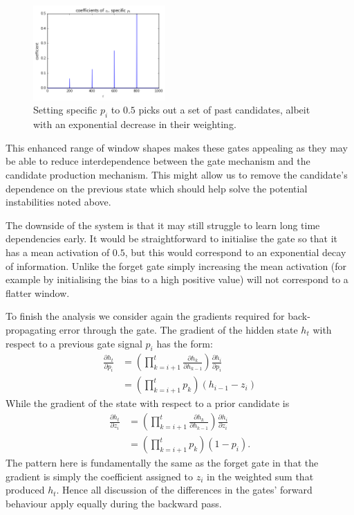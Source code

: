 \begin{figure}[tbp]
\centering
\includegraphics[width=0.45\textwidth]{newarchs/cvextrain}
\caption[Convex gate choosing several past candidates]
{Setting specific \(p_i\) to \(0.5\) picks out a set of past candidates, albeit with
an exponential decrease in their weighting.}
\label{fig:cvextrain}
\end{figure}

This enhanced range of window shapes makes these gates appealing as they may be able to reduce
interdependence between the gate mechanism and the candidate production mechanism. This might
allow us to remove the candidate's dependence on the previous state which should help solve the
potential instabilities noted above.

The downside of the system is that it may still struggle to learn long time dependencies early.
It would be straightforward to initialise the gate so that it has a mean activation of \(0.5\),
but this would correspond to an exponential decay of information. Unlike the forget gate simply
increasing the mean activation (for example by initialising the bias to a high positive value)
will not correspond to a flatter window.

To finish the analysis we consider again the gradients required for back-propagating error through
the gate. The gradient of the hidden state \(h_t\) with respect to a previous gate signal
\(p_i\) has the form:
\begin{align}
	\frac{\partial h_t}{\partial p_i} &= 
		\left(\prod_{k=i+1}^t \frac{\partial h_k}{\partial h_{k-1}}\right) 
			\frac{\partial h_i}{\partial p_i} \\
	&= \left( \prod_{k=i+1}^t p_k \right) (h_{i-1} - z_i) \label{eq:cvexgrad}
\end{align}
While the gradient of the state with respect to a prior candidate is
\begin{align}
	\frac{\partial h_t}{\partial z_i} &=
		\left(\prod_{k=i+1}^t \frac{\partial h_k}{\partial h_{k-1}}\right) 
			\frac{\partial h_i}{\partial z_i} \\
	&= \left( \prod_{k=i+1}^t p_k \right) (1 - p_i). \label{eq:cvexstategrad}
\end{align} The pattern here is fundamentally the same as the forget gate in that the gradient
is simply the coefficient assigned to \(z_i\) in the weighted sum that produced \(h_t\). Hence
all discussion of the differences in the gates' forward behaviour apply equally during the
backward pass.

